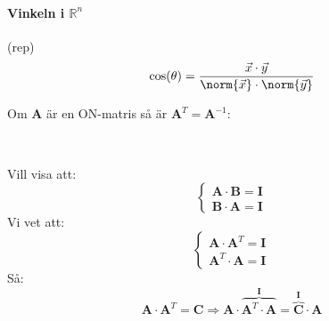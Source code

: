 \paragraph{Vinkeln i $\mathbb{R}^n$} %
  \label{par:vinkeln_i_}
  (rep)
  \[
  \cos(\theta) = \frac{\vec{x} \cdot \vec{y}}{\norm{\vec{x}} \cdot \norm{\vec{y}}}
  \]
\begin{sats}
	Om \textbf{A} är en ON-matris så är $\mathbf{A}^T = \mathbf{A}^{-1}$:
\end{sats}\\
\begin{bevis}
	Vill visa att:
\[
\begin{cases}
  	\mathbf{A} \cdot \mathbf{B} = \mathbf{I}\\
  	\mathbf{B} \cdot \mathbf{A} = \mathbf{I}
  \end{cases}  
\]  
Vi vet att:
\[
\begin{cases}
	\mathbf{A} \cdot \mathbf{A}^T = \mathbf{I}\\
	\mathbf{A}^T \cdot \mathbf{A} = \mathbf{I}
\end{cases}
\]
Så:
\[
\mathbf{A} \cdot \mathbf{A}^T = \mathbf{C} \Rightarrow \mathbf{A} \cdot \overbrace{\mathbf{A}^T \cdot \mathbf{A}}^\mathbf{I} = \overbrace{\mathbf{C}}^\mathbf{I} \cdot \mathbf{A}
\]
\end{bevis}


